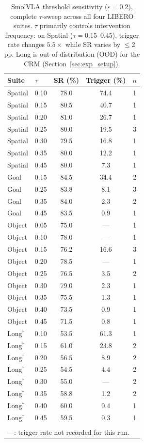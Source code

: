 \begin{table}[h]
\centering
\caption{SmolVLA threshold sensitivity ($\varepsilon{=}0.2$), complete $\tau$-sweep across all four LIBERO suites. $\tau$ primarily controls intervention frequency: on Spatial ($\tau{=}0.15$--$0.45$), trigger rate changes $5.5{\times}$ while SR varies by ${\leq}$2\,pp. Long is out-of-distribution (OOD) for the CRM (Section~\ref{sec:exp_setup}).}
\label{tab:tau_sweep}
\small
\begin{tabular}{llccc}
\toprule
Suite & $\tau$ & SR (\%) & Trigger (\%) & $n$ \\
\midrule
Spatial & 0.10 & 78.0 & 74.4 & 1 \\
Spatial & 0.15 & 80.5 & 40.7 & 1 \\
Spatial & 0.20 & 81.0 & 26.7 & 1 \\
Spatial & 0.25 & 80.0 & 19.5 & 3 \\
Spatial & 0.30 & 79.5 & 16.8 & 1 \\
Spatial & 0.35 & 80.0 & 12.2 & 1 \\
Spatial & 0.45 & 80.0 & 7.3 & 1 \\
\midrule
Goal & 0.15 & 84.5 & 34.4 & 2 \\
Goal & 0.25 & 83.8 & 8.1 & 3 \\
Goal & 0.35 & 84.0 & 2.3 & 2 \\
Goal & 0.45 & 83.5 & 0.9 & 1 \\
\midrule
Object & 0.05 & 75.0 & --- & 1 \\
Object & 0.10 & 78.0 & --- & 1 \\
Object & 0.15 & 76.2 & 16.6 & 3 \\
Object & 0.20 & 78.5 & --- & 1 \\
Object & 0.25 & 76.5 & 3.5 & 2 \\
Object & 0.30 & 79.0 & 2.3 & 1 \\
Object & 0.35 & 75.5 & 1.3 & 1 \\
Object & 0.40 & 73.5 & 0.9 & 1 \\
Object & 0.45 & 71.5 & 0.8 & 1 \\
\midrule
Long$^{\dagger}$ & 0.10 & 53.5 & 61.3 & 1 \\
Long$^{\dagger}$ & 0.15 & 61.0 & 23.8 & 2 \\
Long$^{\dagger}$ & 0.20 & 56.5 & 8.9 & 2 \\
Long$^{\dagger}$ & 0.25 & 54.5 & 4.4 & 2 \\
Long$^{\dagger}$ & 0.30 & 55.0 & --- & 2 \\
Long$^{\dagger}$ & 0.35 & 58.8 & 1.2 & 2 \\
Long$^{\dagger}$ & 0.40 & 60.0 & 0.4 & 1 \\
Long$^{\dagger}$ & 0.45 & 59.5 & 0.3 & 1 \\
\bottomrule
\addlinespace[2pt]
\multicolumn{5}{l}{\scriptsize $n$: seeds averaged. ${}^{\dagger}$CRM is OOD on Long (trained on 3 suites).}\\
\multicolumn{5}{l}{\scriptsize ---: trigger rate not recorded for this run.}
\end{tabular}
\end{table}

